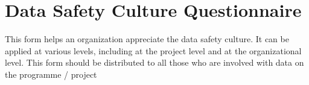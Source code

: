 %
%
\chapter{Data Safety Culture Questionnaire} \label{bkm:culture}


This form helps an organization appreciate the data safety culture. It can be applied at various levels, including at the project level and at the organizational level. This form should be distributed to all those who are involved with data on the programme / project


